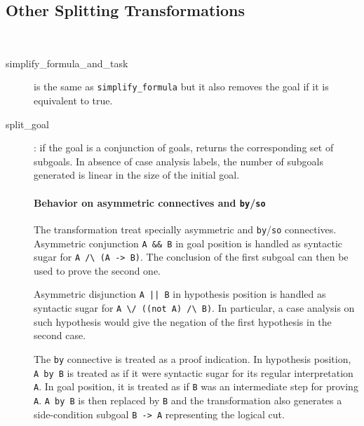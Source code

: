 \subsection{Other Splitting Transformations}~\label{tech:trans:split}

\begin{description}

\item[simplify\_formula\_and\_task] is the same as \texttt{simplify\_formula}
  but it also removes the goal if it is equivalent to true.

\item[split\_goal]: if the goal is a conjunction of goals, returns the
  corresponding set of subgoals. In absence of case analysis labels,
  the number of subgoals generated is linear in the size of the initial goal.

  \paragraph{Behavior on asymmetric connectives and
    \texttt{by}/\texttt{so}}

  The transformation treat specially asymmetric and
  \texttt{by}/\texttt{so} connectives. Asymmetric conjunction
  \verb|A && B| in goal position is handled as syntactic sugar for
  \verb|A /\ (A -> B)|.  The conclusion of the first subgoal can then
  be used to prove the second one.

  Asymmetric disjunction \verb+A || B+ in hypothesis position is handled as
  syntactic sugar for \verb|A \/ ((not A) /\ B)|.
  In particular, a case analysis on such hypothesis would give the negation of
  the first hypothesis in the second case.

  The \texttt{by} connective is treated as a proof indication. In
  hypothesis position, \verb|A by B| is treated as if it were
  syntactic sugar for its regular interpretation \verb|A|. In goal
  position, it is treated as if \verb|B| was an intermediate step for
  proving \verb|A|. \verb|A by B| is then replaced by \verb|B| and the
  transformation also generates a side-condition subgoal \verb|B -> A|
  representing the logical cut.


\end{description}
